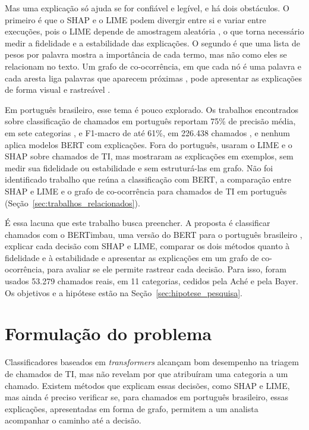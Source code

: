 \documentclass[
    12pt,                %
    openright,           %
    oneside,             %
    a4paper,             %
    english,             %
    brazil               %
]{abntex2}
\begin{document}
Mas uma explicação só ajuda se for confiável e legível, e há dois obstáculos. O primeiro é que o SHAP e o LIME podem divergir entre si e variar entre execuções, pois o LIME depende de amostragem aleatória \cite{salih2023}, o que torna necessário medir a fidelidade e a estabilidade das explicações. O segundo é que uma lista de pesos por palavra mostra a importância de cada termo, mas não como eles se relacionam no texto. Um grafo de co-ocorrência, em que cada nó é uma palavra e cada aresta liga palavras que aparecem próximas \cite{yao2019}, pode apresentar as explicações de forma visual e rastreável \cite{talebi2025}.

Em português brasileiro, esse tema é pouco explorado. Os trabalhos encontrados sobre classificação de chamados em português reportam 75\% de precisão média, em sete categorias \cite{pereira2023}, e F1-macro de até 61\%, em 226.438 chamados \cite{yokota2025}, e nenhum aplica modelos BERT com explicações. Fora do português,  usaram o LIME e o SHAP sobre chamados de TI, mas mostraram as explicações em exemplos, sem medir sua fidelidade ou estabilidade e sem estruturá-las em grafo. Não foi identificado trabalho que reúna a classificação com BERT, a comparação entre SHAP e LIME e o grafo de co-ocorrência para chamados de TI em português (Seção~\ref{sec:trabalhos_relacionados}).

É essa lacuna que este trabalho busca preencher. A proposta é classificar chamados com o BERTimbau, uma versão do BERT para o português brasileiro \cite{souza2020}, explicar cada decisão com SHAP e LIME, comparar os dois métodos quanto à fidelidade e à estabilidade e apresentar as explicações em um grafo de co-ocorrência, para avaliar se ele permite rastrear cada decisão. Para isso, foram usados 53.279 chamados reais, em 11 categorias, cedidos pela Aché e pela Bayer. Os objetivos e a hipótese estão na Seção~\ref{sec:hipotese_pesquisa}.

\section{Formulação do problema}
\label{sec:problema}

Classificadores baseados em \textit{transformers} alcançam bom desempenho na triagem de chamados de TI, mas não revelam por que atribuíram uma categoria a um chamado. Existem métodos que explicam essas decisões, como SHAP e LIME, mas ainda é preciso verificar se, para chamados em português brasileiro, essas explicações, apresentadas em forma de grafo, permitem a um analista acompanhar o caminho até a decisão.
\end{document}
